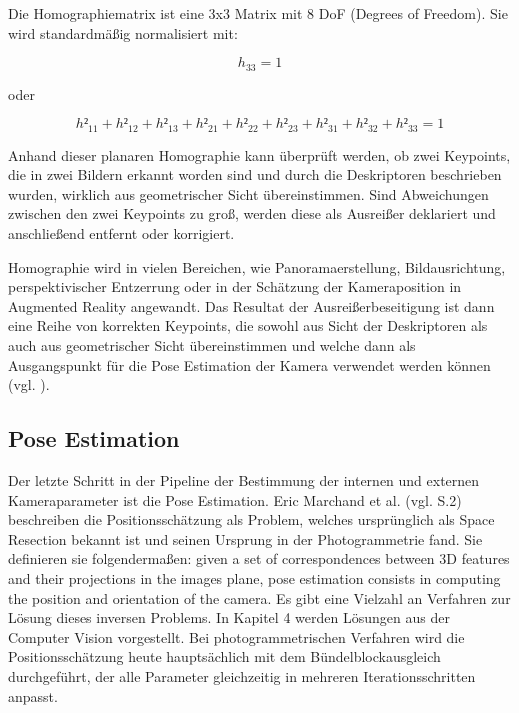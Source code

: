 Die Homographiematrix ist eine 3x3 Matrix mit 8 DoF (Degrees of Freedom). Sie wird standardmäßig normalisiert mit: 

\begin{equation}
h_33 = 1
\end{equation}

oder 

\begin{equation}
h²_{11} + h²_{12} + h²_{13} + h²_{21} + h²_{22} + h²_{23} + h²_{31} + h²_{32} + h²_{33} = 1
\end{equation}

Anhand dieser planaren Homographie kann überprüft werden, ob zwei Keypoints, die in zwei Bildern erkannt worden sind und durch die Deskriptoren beschrieben wurden, wirklich aus geometrischer Sicht übereinstimmen. Sind Abweichungen zwischen den zwei Keypoints zu groß, werden diese als Ausreißer deklariert und anschließend entfernt oder korrigiert. 

Homographie wird in vielen Bereichen, wie Panoramaerstellung, Bildausrichtung, perspektivischer Entzerrung oder in der Schätzung der Kameraposition in Augmented Reality angewandt. Das Resultat der Ausreißerbeseitigung ist dann eine Reihe von korrekten Keypoints, die sowohl aus Sicht der Deskriptoren als auch aus geometrischer Sicht übereinstimmen und welche dann als Ausgangspunkt für die Pose Estimation der Kamera verwendet werden können (vgl. \cite{homography}). 

\subsection{Pose Estimation}

Der letzte Schritt in der Pipeline der Bestimmung der internen und externen Kameraparameter ist die Pose Estimation. Eric Marchand et al. (vgl. \cite{pose_estimation} S.2) beschreiben die Positionsschätzung als Problem, welches ursprünglich als \glqq Space Resection\grqq{} bekannt ist und seinen Ursprung in der Photogrammetrie fand. Sie definieren sie folgendermaßen: \glqq given a set of correspondences between 3D features and their projections in the images plane, pose estimation consists in computing the position and orientation of the camera\grqq{}. Es gibt eine Vielzahl an Verfahren zur Lösung dieses inversen Problems. In Kapitel 4 werden Lösungen aus der Computer Vision vorgestellt. Bei photogrammetrischen Verfahren wird die Positionsschätzung heute hauptsächlich mit dem Bündelblockausgleich durchgeführt, der alle Parameter gleichzeitig in mehreren Iterationsschritten anpasst.


